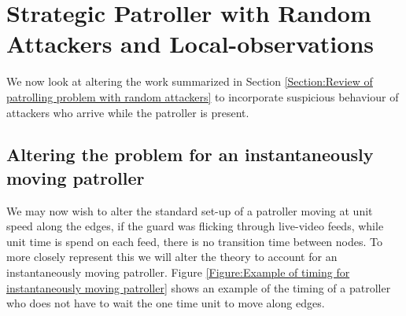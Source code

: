 \documentclass[a4paper,10pt]{article}
\theoremstyle{definition}
\theoremstyle{definition}
\theoremstyle{remark}
\theoremstyle{definition}
\begin{document}
%
%
%
%
%
%
%

\section{Strategic Patroller with Random Attackers and Local-observations}
\label{Section:Patrolling games with random attackers and local-observations}
We now look at altering the work summarized in Section \ref{Section:Review of patrolling problem with random attackers} to incorporate suspicious behaviour of attackers who arrive while the patroller is present.

\subsection{Altering the problem for an instantaneously moving patroller}
We may now wish to alter the standard set-up of a patroller moving at unit speed along the edges, if the guard was flicking through live-video feeds, while unit time is spend on each feed, there is no transition time between nodes. To more closely represent this we will alter the theory to account for an instantaneously moving patroller. Figure \ref{Figure:Example of timing for instantaneously moving patroller} shows an example of the timing of a patroller who does not have to wait the one time unit to move along edges.
\end{document}
